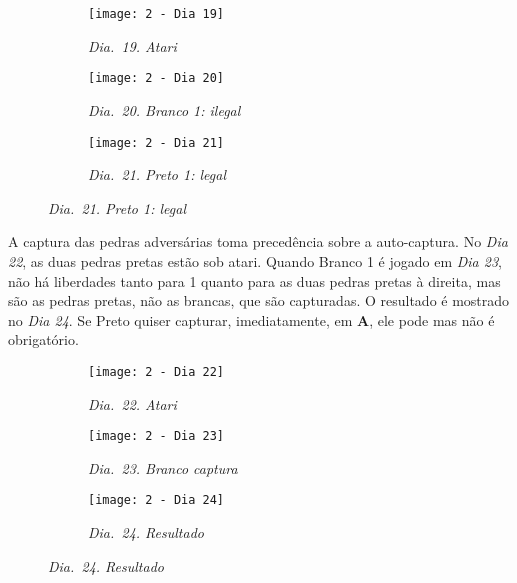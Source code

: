 \begin{figure}[h]
    \centering
    \begin{subfigure}[t]{.3\textwidth}
        \centering
        \texttt{[image: 2 - Dia 19]}
        \captionsetup{justification=centering}
        \caption*{\emph{Dia.\@~19. Atari}}
    \end{subfigure}
    \hfill
    \begin{subfigure}[t]{.3\textwidth}
        \centering
        \texttt{[image: 2 - Dia 20]}
        \captionsetup{justification=centering}
        \caption*{\emph{Dia.\@~20. Branco 1: ilegal}}
    \end{subfigure}
    \hfill
    \begin{subfigure}[t]{.3\textwidth}
        \centering
        \texttt{[image: 2 - Dia 21]}
        \captionsetup{justification=centering}
        \caption*{\emph{Dia.\@~21. Preto 1: legal}}
    \end{subfigure}
\end{figure}

\pagebreak

A captura das pedras adversárias toma precedência sobre a auto-captura. No \emph{Dia 22}, as duas pedras pretas estão sob atari. Quando Branco 1 é jogado em \emph{Dia 23}, não há liberdades tanto para 1 quanto para as duas pedras pretas à direita, mas são as pedras pretas, não as brancas, que são capturadas. O resultado é mostrado no \emph{Dia 24}. Se Preto quiser capturar, imediatamente, em \textbf{A}, ele pode mas não é obrigatório.

\begin{figure}[h]
    \centering
    \begin{subfigure}[t]{.3\textwidth}
        \centering
        \texttt{[image: 2 - Dia 22]}
        \captionsetup{justification=centering}
        \caption*{\emph{Dia.\@~22. Atari}}
    \end{subfigure}
    \hfill
    \begin{subfigure}[t]{.3\textwidth}
        \centering
        \texttt{[image: 2 - Dia 23]}
        \captionsetup{justification=centering}
        \caption*{\emph{Dia.\@~23. Branco captura}}
    \end{subfigure}
    \hfill
    \begin{subfigure}[t]{.3\textwidth}
        \centering
        \texttt{[image: 2 - Dia 24]}
        \captionsetup{justification=centering}
        \caption*{\emph{Dia.\@~24. Resultado}}
    \end{subfigure}
\end{figure}

